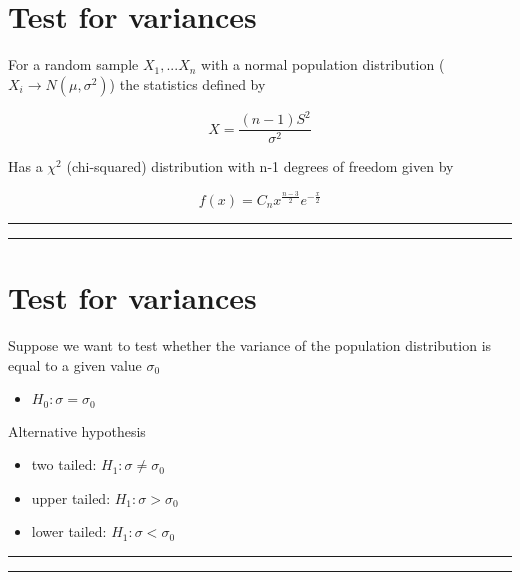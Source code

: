 \documentclass[
]{book}
\providecommand{\tightlist}{%
  \setlength{\itemsep}{0pt}\setlength{\parskip}{0pt}}
\begin{document}
\hypertarget{test-for-variances-1}{%
\section{Test for variances}\label{test-for-variances-1}}

For a random sample \(X_1,...X_n\) with a normal population distribution (\(X_i \rightarrow N(\mu, \sigma^2)\)) the statistics defined by

\[X=\frac{(n-1)S^2}{\sigma^2}\]

Has a \(\chi^2\) (chi-squared) distribution with n-1 degrees of freedom given by

\[f(x)=C_n  x^{\frac{n-3}{2}} e^{-\frac{x}{2}}\]

\begin{center}\rule{0.5\linewidth}{0.5pt}\end{center}

\begin{center}\rule{0.5\linewidth}{0.5pt}\end{center}

\hypertarget{test-for-variances-2}{%
\section{Test for variances}\label{test-for-variances-2}}

Suppose we want to test whether the variance of the population distribution is equal to a given value \(\sigma_0\)

\begin{itemize}
\tightlist
\item
  \(H_0:\sigma=\sigma_0\)
\end{itemize}

Alternative hypothesis

\begin{itemize}
\item
  two tailed: \(H_1:\sigma \neq \sigma_0\)
\item
  upper tailed: \(H_1:\sigma > \sigma_0\)
\item
  lower tailed: \(H_1:\sigma < \sigma_0\)
\end{itemize}

\begin{center}\rule{0.5\linewidth}{0.5pt}\end{center}

\begin{center}\rule{0.5\linewidth}{0.5pt}\end{center}
\end{document}
